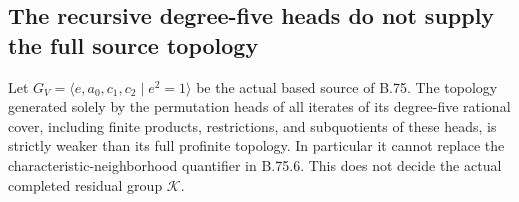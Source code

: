 \subsection*{The recursive degree-five heads do not supply the full source topology}
\label{stmt:B157}
Let \(G_V=\langle e,a_0,c_1,c_2\mid e^2=1\rangle\) be the
actual based source of B.75. The topology generated solely by the
permutation heads of all iterates of its degree-five rational cover,
including finite products, restrictions, and subquotients of these heads,
is strictly weaker than its full profinite topology. In particular it
cannot replace the characteristic-neighborhood quantifier in B.75.6.
This does not decide the actual completed residual group \(\mathcal K\).

